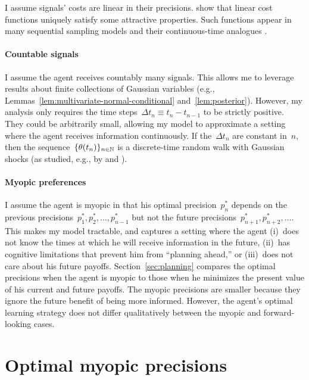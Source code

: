 \documentclass[11pt,oneside]{article}
\begin{document}
I assume signals' costs are linear in their precisions.
\cite{Pomatto-etal-2023-AER} show that linear cost functions uniquely satisfy some attractive properties.
Such functions appear in many sequential sampling models \citep[e.g.,][]{Morris-Strack-2019-,Wald-1945-AnnMathStat,Wald-1947-ECTA} and their continuous-time analogues \citep[e.g.,][]{Fudenberg-etal-2018-AER,Liang-etal-2022-ECTA}.

\paragraph{Countable signals}

I assume the agent receives countably many signals.
This allows me to leverage results about finite collections of Gaussian variables (e.g., Lemmas~\ref{lem:multivariate-normal-conditional} and~\ref{lem:posterior}).
However, my analysis only requires the time steps~$\Delta t_n\equiv t_n-t_{n-1}$ to be strictly positive.
They could be arbitrarily small, allowing my model to approximate a setting where the agent receives information continuously.
If the~$\Delta t_n$ are constant in~$n$, then the sequence~$\{\theta(t_n)\}_{n\in\mathbb{N}}$ is a discrete-time random walk with Gaussian shocks (as studied, e.g., by \cite{Dasaratha-etal-2023-REStud} and \cite{Immorlica-etal-2021-LeibnizInt.Proc.Inform.LIPIcs}).

\paragraph{Myopic preferences}

I assume the agent is myopic in that his optimal precision~$p_n^*$ depends on the previous precisions~$p_1^*,p_2^*,\ldots,p_{n-1}^*$ but not the future precisions~$p_{n+1}^*,p_{n+2}^*,\ldots$.
This makes my model tractable, and captures a setting where the agent
(i)~does not know the times at which he will receive information in the future,
(ii)~has cognitive limitations that prevent him from ``planning ahead,'' or
(iii)~does not care about his future payoffs.
Section~\ref{sec:planning} compares the optimal precisions when the agent is myopic to those when he minimizes the present value of his current and future payoffs.
The myopic precisions are smaller because they ignore the future benefit of being more informed.
However, the agent's optimal learning strategy does not differ qualitatively between the myopic and forward-looking cases.

\section{Optimal myopic precisions}
\label{sec:solution}
\end{document}
